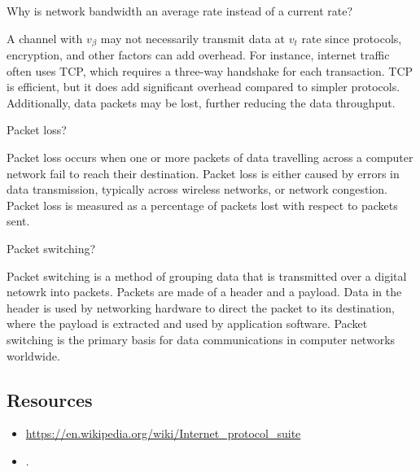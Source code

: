 \begin{quest}
	\item Why is network bandwidth an average rate instead of a current rate?
	\begin{ans}
		A channel with $v_\beta$ may not necessarily transmit data at $v_t$ rate since protocols, encryption, and other factors can add overhead. For instance, internet traffic often uses TCP, which requires a three-way handshake for each transaction. TCP is efficient, but it does add significant overhead compared to simpler protocols. Additionally, data packets may be lost, further reducing the data throughput. 
	\end{ans}

	\item Packet loss?
	\begin{ans}
		Packet loss occurs when one or more packets of data travelling across a computer network fail to reach their destination. Packet loss is either caused by errors in data transmission, typically across wireless networks, or network congestion. Packet loss is measured as a percentage of packets lost with respect to packets sent.
	\end{ans}

	\item Packet switching?
	\begin{ans}
		Packet switching is a method of grouping data that is transmitted over a digital netowrk into packets. Packets are made of a header and a payload. Data in the header is used by networking hardware to direct the packet to its destination, where the payload is extracted and used by application software. Packet switching is the primary basis for data communications in computer networks worldwide.
	\end{ans}
	\item 
\end{quest}






\subsection*{Resources}
\begin{itemize}
	\item \url{https://en.wikipedia.org/wiki/Internet_protocol_suite}
	\item .
\end{itemize}
